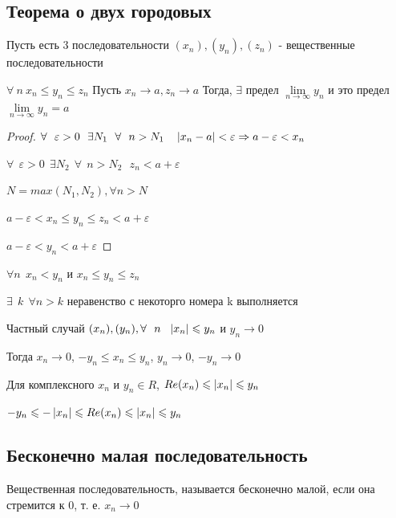 \subsection{Теорема о двух городовых}
\begin{theorem*}
    Пусть есть 3 последовательности $(x_n), (y_n), (z_n)$ - вещественные последовательности
    
    $\forall \ n \ x_n \leqslant y_n \leqslant z_n$ Пусть $x_n \longrightarrow a, z_n \longrightarrow a$
    Тогда, $\exists$ предел $\lim\limits_{n \to \infty} y_n$ и это предел $\lim\limits_{n \to \infty} y_n = a$
\end{theorem*}
\begin{proof}
    $\forall \ \ \varepsilon > 0 \ \ \exists N_1 \ \ \forall \ \ n > N_1 \ \ \ \left| x_n - a \right| < \varepsilon \Rightarrow a - \varepsilon < x_n$
    
    $\forall \ \ \varepsilon > 0 \ \ \exists N_2 \ \ \forall \ \ n > N_2 \ \ \ z_n < a + \varepsilon$
    
    $N = max(N_1, N_2), \forall n > N$
    
    $a - \varepsilon < x_n \leqslant y_n \leqslant z_n < a + \varepsilon$
    
    $a - \varepsilon < y_n < a + \varepsilon$
\end{proof}
\begin{remark}
    $\forall n \ \ x_n < y_n$ и $x_n \leqslant y_n \leqslant z_n$
    
    $\exists \ \ k \ \ \forall n > k$ неравенство с некоторго номера k выполняется
    
    Частный случай $(x_n), (y_n), \forall \ \ n \ \ \left| x_n \right| \leqslant y_n $ и $y_n \longrightarrow 0$
    
    Тогда $x_n \longrightarrow 0$, $-y_n \leqslant x_n \leqslant y_n$, $y_n \longrightarrow 0$, $-y_n \longrightarrow 0$
    
    Для комплексного $x_n$ и $y_n \in R$, $Re(x_n) \leqslant \left| x_n \right| \leqslant y_n$
    
    $-y_n \leqslant -\left| x_n \right| \leqslant Re(x_n) \leqslant \left| x_n \right| \leqslant y_n$
\end{remark}
\newpage
\subsection{Бесконечно малая последовательность}
    Вещественная последовательность, называется бесконечно малой, если она стремится к 0, т. е. $x_n \longrightarrow 0$
    
